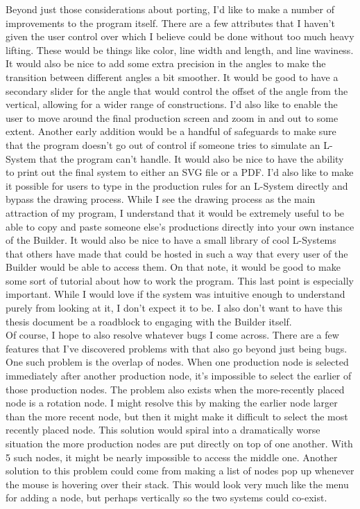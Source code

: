 \documentclass[12pt,twoside]{reedthesis}
\begin{document}
	Beyond just those considerations about porting, I'd like to make a number of improvements to the program itself. There are a few attributes that I haven't given the user control over which I believe could be done without too much heavy lifting. These would be things like color, line width and length, and line waviness. It would also be nice to add some extra precision in the angles to make the transition between different angles a bit smoother. It would be good to have a secondary slider for the angle that would control the offset of the angle from the vertical, allowing for a wider range of constructions. I'd also like to enable the user to move around the final production screen and zoom in and out to some extent. Another early addition would be a handful of safeguards to make sure that the program doesn't go out of control if someone tries to simulate an L-System that the program can't handle. It would also be nice to have the ability to print out the final system to either an SVG file or a PDF. I'd also like to make it possible for users to type in the production rules for an L-System directly and bypass the drawing process. While I see the drawing process as the main attraction of my program, I understand that it would be extremely useful to be able to copy and paste someone else's productions directly into your own instance of the Builder. It would also be nice to have a small library of cool L-Systems that others have made that could be hosted in such a way that every user of the Builder would be able to access them. On that note, it would be good to make some sort of tutorial about how to work the program. This last point is especially important. While I would love if the system was intuitive enough to understand purely from looking at it, I don't expect it to be. I also don't want to have this thesis document be a roadblock to engaging with the Builder itself.\\
	
	Of course, I hope to also resolve whatever bugs I come across. There are a few features that I've discovered problems with that also go beyond just being bugs. One such problem is the overlap of nodes. When one production node is selected immediately after another production node, it's impossible to select the earlier of those production nodes. The problem also exists when the more-recently placed node is a rotation node. I might resolve this by making the earlier node larger than the more recent node, but then it might make it difficult to select the most recently placed node. This solution would spiral into a dramatically worse situation the more production nodes are put directly on top of one another. With 5 such nodes, it might be nearly impossible to access the middle one. Another solution to this problem could come from making a list of nodes pop up whenever the mouse is hovering over their stack. This would look very much like the menu for adding a node, but perhaps vertically so the two systems could co-exist.\\
	
\end{document}
